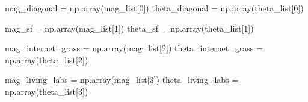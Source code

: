 \documentclass[
  letterpaper,
]{report}
\newenvironment{Shaded}{\begin{snugshade}}{\end{snugshade}}
\newcommand{\DecValTok}[1]{\textcolor[rgb]{0.68,0.00,0.00}{#1}}
\newcommand{\NormalTok}[1]{\textcolor[rgb]{0.00,0.23,0.31}{#1}}
\newcommand{\OperatorTok}[1]{\textcolor[rgb]{0.37,0.37,0.37}{#1}}
\begin{document}
\begin{Shaded}
\begin{Highlighting}[]
\NormalTok{mag\_diagonal }\OperatorTok{=}\NormalTok{ np.array(mag\_list[}\DecValTok{0}\NormalTok{])}
\NormalTok{theta\_diagonal }\OperatorTok{=}\NormalTok{ np.array(theta\_list[}\DecValTok{0}\NormalTok{])}


\NormalTok{mag\_sf }\OperatorTok{=}\NormalTok{ np.array(mag\_list[}\DecValTok{1}\NormalTok{])}
\NormalTok{theta\_sf }\OperatorTok{=}\NormalTok{ np.array(theta\_list[}\DecValTok{1}\NormalTok{])}


\NormalTok{mag\_internet\_grass }\OperatorTok{=}\NormalTok{ np.array(mag\_list[}\DecValTok{2}\NormalTok{])}
\NormalTok{theta\_internet\_grass }\OperatorTok{=}\NormalTok{ np.array(theta\_list[}\DecValTok{2}\NormalTok{])}


\NormalTok{mag\_living\_labs }\OperatorTok{=}\NormalTok{ np.array(mag\_list[}\DecValTok{3}\NormalTok{])}
\NormalTok{theta\_living\_labs }\OperatorTok{=}\NormalTok{ np.array(theta\_list[}\DecValTok{3}\NormalTok{])}
\end{Highlighting}
\end{Shaded}
\end{document}
